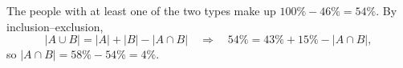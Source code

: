 The people with at least one of the two types make up $100\%-46\%=54\%$. By inclusion--exclusion,
\[
|A\cup B|=|A|+|B|-|A\cap B|\quad\Longrightarrow\quad 54\%=43\%+15\%-|A\cap B| ,
\]
so $|A\cap B|=58\%-54\%=\boxed{4\%}$.
